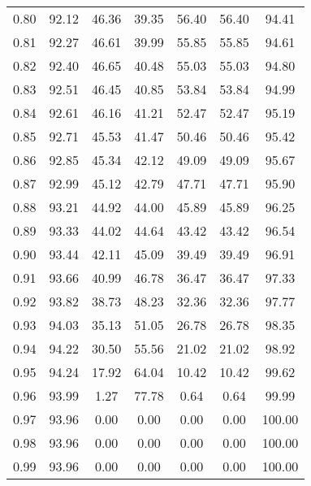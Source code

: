 \begin{tabular}{|c|c|c|c|c|c|c|}
      0.80 &     92.12 &     46.36 &      39.35 &   56.40 &      56.40 &         94.41 \\
      0.81 &     92.27 &     46.61 &      39.99 &   55.85 &      55.85 &         94.61 \\
      0.82 &     92.40 &     46.65 &      40.48 &   55.03 &      55.03 &         94.80 \\
      0.83 &     92.51 &     46.45 &      40.85 &   53.84 &      53.84 &         94.99 \\
      0.84 &     92.61 &     46.16 &      41.21 &   52.47 &      52.47 &         95.19 \\
      0.85 &     92.71 &     45.53 &      41.47 &   50.46 &      50.46 &         95.42 \\
      0.86 &     92.85 &     45.34 &      42.12 &   49.09 &      49.09 &         95.67 \\
      0.87 &     92.99 &     45.12 &      42.79 &   47.71 &      47.71 &         95.90 \\
      0.88 &     93.21 &     44.92 &      44.00 &   45.89 &      45.89 &         96.25 \\
      0.89 &     93.33 &     44.02 &      44.64 &   43.42 &      43.42 &         96.54 \\
      0.90 &     93.44 &     42.11 &      45.09 &   39.49 &      39.49 &         96.91 \\
      0.91 &     93.66 &     40.99 &      46.78 &   36.47 &      36.47 &         97.33 \\
      0.92 &     93.82 &     38.73 &      48.23 &   32.36 &      32.36 &         97.77 \\
      0.93 &     94.03 &     35.13 &      51.05 &   26.78 &      26.78 &         98.35 \\
      0.94 &     94.22 &     30.50 &      55.56 &   21.02 &      21.02 &         98.92 \\
      0.95 &     94.24 &     17.92 &      64.04 &   10.42 &      10.42 &         99.62 \\
      0.96 &     93.99 &      1.27 &      77.78 &    0.64 &       0.64 &         99.99 \\
      0.97 &     93.96 &      0.00 &       0.00 &    0.00 &       0.00 &        100.00 \\
      0.98 &     93.96 &      0.00 &       0.00 &    0.00 &       0.00 &        100.00 \\
      0.99 &     93.96 &      0.00 &       0.00 &    0.00 &       0.00 &        100.00 \\
\bottomrule
\end{tabular}
